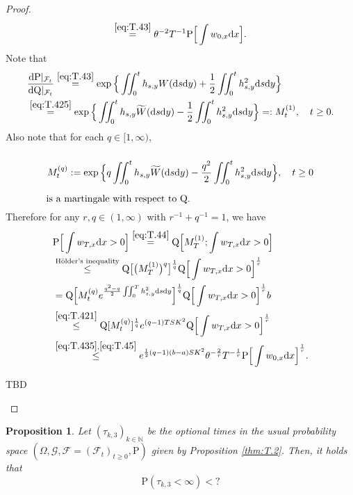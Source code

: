 \documentclass[12pt,a4paper]{amsart}
\numberwithin{equation}{section}
\theoremstyle{plain}
\newtheorem{proposition}[theorem]{Proposition}
\theoremstyle{remark}
\newenvironment{proof*}[1][\proofname]{
	\renewcommand\qedsymbol{\rule{3mm}{3mm}}
	\begin{proof}[#1]}{\end{proof}}
\begin{document}
\begin{proof}
\begin{align}
\overset{\eqref{eq:T.43}}= \theta^{-2} T^{-1} \mathrm P\Big[\int w_{0,x}\mathrm dx\Big].
\end{align}
	Note that
\begin{align}
	&\frac{\mathrm d \mathrm P|_{\mathcal F_t}}{\mathrm d \mathrm Q|_{\mathcal F_t}}
	\overset{\eqref{eq:T.43}}= \exp\Big\{\iint_0^t h_{s,y}W(\mathrm ds\mathrm dy)+ \frac{1}{2} \iint_0^t h_{s,y}^2 \mathrm ds\mathrm dy\Big\}
	\\\label{eq:T.44}& \overset{\eqref{eq:T.425}}= \exp\Big\{\iint_0^t h_{s,y}\widetilde W(\mathrm ds\mathrm dy)- \frac{1}{2} \iint_0^t h_{s,y}^2 \mathrm ds\mathrm dy\Big\}
	=: M_t^{(1)}, \quad t\geq 0.
\end{align}
	Also note that for each $q \in [1,\infty)$,
\begin{equation}\label{eq:T.45}
\begin{minipage}{0.8\textwidth}
\[
M^{(q)}_t:=\exp\Big\{q\iint_0^t h_{s,y} \widetilde W(\mathrm ds\mathrm dy)- \frac{q^2}{2}\iint_0^t h_{s,y}^2 \mathrm ds\mathrm dy\Big\}, \quad t\geq 0
\]
	is a martingale with respect to $\mathrm Q$.
\end{minipage}
\end{equation}
	Therefore for any $r, q\in (1,\infty)$ with $r^{-1}+q^{-1} = 1$, we have
\begin{align} 
& \mathrm P\Big[\int w_{T,x} \mathrm dx > 0\Big] 
\overset{\eqref{eq:T.44}}= \mathrm Q\Big[M_T^{(1)};\int w_{T,x} \mathrm dx > 0\Big]
\\& \overset{\text{H\"older's inequality}}\leq \mathrm Q\big[\big(M_T^{(1)}\big)^q\big]^{\frac{1}{q}} \mathrm Q\Big[\int w_{T,x}\mathrm dx > 0\Big]^{\frac{1}{r}}
\\& = \mathrm Q\Big[M_t^{(q)} e^{\frac{q^2 - q}{2}\iint_0^T h_{s,y}^2\mathrm ds\mathrm dy}\Big]^{\frac{1}{q}} \mathrm Q\Big[\int w_{T,x}\mathrm dx > 0\Big]^{\frac{1}{r}}b
 \\& \overset{\eqref{eq:T.421}}\leq \mathrm Q[M_t^{(q)}]^{\frac{1}{q}} e^{(q-1)TSK^2} \mathrm Q\Big[\int w_{T,x}\mathrm dx > 0\Big]^{\frac{1}{r}} 
\\&\overset{\eqref{eq:T.435},\eqref{eq:T.45}}\leq e^{\frac{1}{2}(q-1)(b-a)SK^2}\theta^{-\frac{2}{r}} T^{-\frac{1}{r}} \mathrm P\Big[\int w_{0,x}\mathrm dx\Big]^{\frac{1}{r}}.
\end{align}
\begin{proof*}
	\color{blue} TBD
\end{proof*}
\end{proof}
	
	\begin{proposition} \label{thm:T.73}
		Let $(\tau_{k,3})_{k\in \mathbb N}$ be the optional times in the usual probability space $(\Omega, \mathcal G, \mathcal F = (\mathcal F_t)_{t\geq 0}, \mathrm P)$ given by Proposition \ref{thm:T.2}.
		Then, it holds that
		\[
		\mathrm P(\tau_{k,3} < \infty) < ?
		\]
	\end{proposition}
\end{document}
